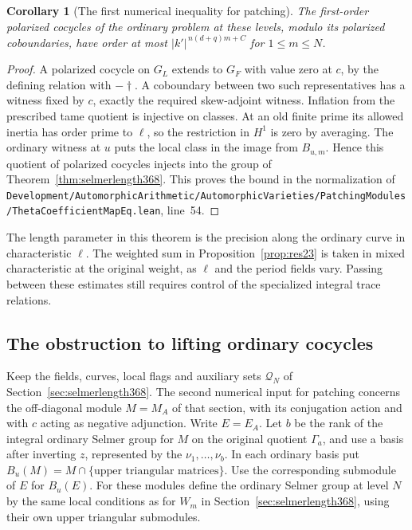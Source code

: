 \documentclass[a4paper,11pt]{article}
\newtheorem{corollary}[proposition]{Corollary}
\theoremstyle{definition}
\theoremstyle{remark}
\newcommand{\srcloc}[2]{{\small\nolinkurl{#1.lean}}, line~#2}
\numberwithin{equation}{section}
\begin{document}
\begin{corollary}[The first numerical inequality for patching]
\label{cor:bfirst368}
The first-order polarized cocycles of the ordinary problem at
these levels, modulo its polarized coboundaries, have order at
most \(|k'|^{\,n(d+q)m+C}\) for \(1\le m\le N\).
\end{corollary}
\begin{proof}
A polarized cocycle on \(G_L\) extends to \(G_F\) with value
zero at \(c\), by the defining relation with \(-\dagger\).
A coboundary between two such representatives has a witness
fixed by \(c\), exactly the required skew-adjoint witness.
Inflation from the prescribed tame quotient is injective on
classes. At an old finite prime its allowed inertia has order
prime to \(\ell\), so the restriction in \(H^1\) is zero by
averaging. The ordinary witness at \(u\) puts the local class
in the image from \(B_{u,m}\). Hence this quotient of polarized
cocycles injects into the group of Theorem~\ref{thm:selmerlength368}.
This proves the bound in the normalization of
\srcloc{Development/AutomorphicArithmetic/AutomorphicVarieties/PatchingModules/ThetaCoefficientMapEq}{54}.
\end{proof}

The length parameter in this theorem is the precision along
the ordinary curve in characteristic \(\ell\). The weighted
sum in Proposition~\ref{prop:res23} is taken in mixed
characteristic at the original weight, as \(\ell\) and the
period fields vary. Passing between these estimates still
requires control of the specialized integral trace relations.


\subsection{The obstruction to lifting ordinary cocycles}
\label{sec:selmerlift369}

Keep the fields, curves, local flags and auxiliary sets
\(\mathcal Q_N\) of Section~\ref{sec:selmerlength368}. The
second numerical input for patching concerns the off-diagonal
module \(M=M_A\) of that section, with its conjugation action
and with \(c\) acting as negative adjunction. Write \(E=E_A\).
Let \(b\) be the rank of the integral ordinary Selmer group
for \(M\) on the original quotient \(\Gamma_a\), and use a
basis after inverting \(z\), represented by the \(\nu_1,\ldots,\nu_b\).
In each ordinary basis put \(B_u(M)=M\cap\{\text{upper
triangular matrices}\}\). Use the corresponding submodule
of \(E\) for \(B_u(E)\). For these modules define the
ordinary Selmer group at level \(N\) by the same local
conditions as for \(W_m\) in Section~\ref{sec:selmerlength368},
using their own upper triangular submodules.
\end{document}
